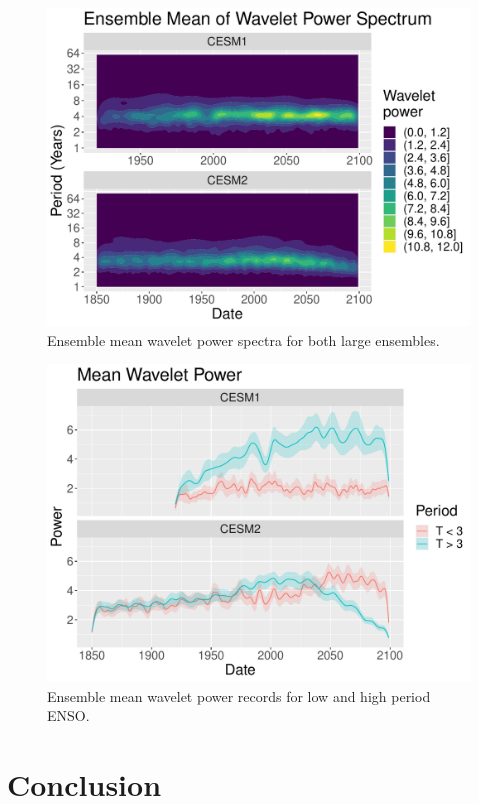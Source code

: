 \documentclass[11pt]{article}
\begin{document}
\begin{figure}
\centering
\includegraphics[width=.8\linewidth]{../../data/figures/wavelet2.pdf}
\caption{\label{fig:wavelet_1}Ensemble mean wavelet power spectra for both large ensembles.}
\end{figure}

\begin{figure}
\centering
\includegraphics[width=.8\linewidth]{../../data/figures/wavelet3.pdf}
\caption{\label{fig:wavelet_2}Ensemble mean wavelet power records for low and high period ENSO.}
\end{figure}

\section{Conclusion}
\end{document}
